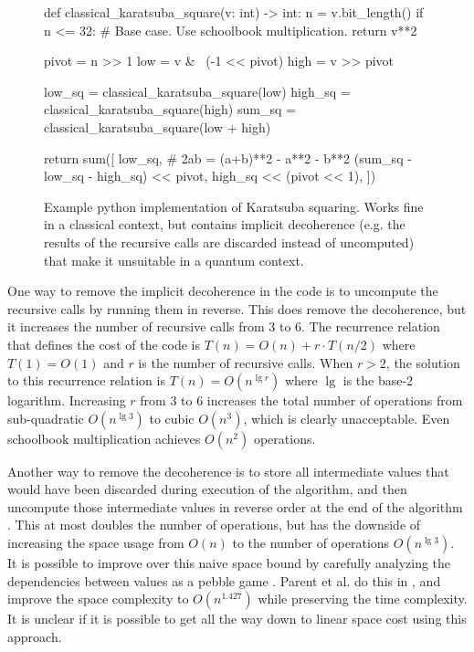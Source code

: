\documentclass[onecolumn,unpublished]{quantumarticle}
\begin{document}
\begin{figure}
\begin{python}
def classical_karatsuba_square(v: int) -> int:
    n = v.bit_length()
    if n <= 32:
        # Base case. Use schoolbook multiplication.
        return v**2

    pivot = n >> 1
    low = v & ~(-1 << pivot)
    high = v >> pivot

    low_sq = classical_karatsuba_square(low)
    high_sq = classical_karatsuba_square(high)
    sum_sq = classical_karatsuba_square(low + high)

    return sum([
        low_sq,
        # 2ab = (a+b)**2 - a**2 - b**2
        (sum_sq - low_sq - high_sq) << pivot,
        high_sq << (pivot << 1),
    ])
\end{python}
\caption{
\label{fig:classical_code}
   Example python implementation of Karatsuba squaring.
   Works fine in a classical context, but contains implicit decoherence (e.g. the results of the recursive calls are discarded instead of uncomputed) that make it unsuitable in a quantum context.
}
\end{figure}

One way to remove the implicit decoherence in the code is to uncompute the recursive calls by running them in reverse.
This does remove the decoherence, but it increases the number of recursive calls from 3 to 6.
The recurrence relation that defines the cost of the code is $T(n) = O(n) + r \cdot T(n/2)$ where $T(1) = O(1)$ and $r$ is the number of recursive calls.
When $r>2$, the solution to this recurrence relation is $T(n) = O(n^{\lg r})$ where $\lg$ is the base-2 logarithm.
Increasing $r$ from 3 to 6 increases the total number of operations from sub-quadratic $O(n^{\lg 3})$ to cubic $O(n^3)$, which is clearly unacceptable.
Even schoolbook multiplication achieves $O(n^2)$ operations.

Another way to remove the decoherence is to store all intermediate values that would have been discarded during execution of the algorithm, and then uncompute those intermediate values in reverse order at the end of the algorithm \cite{bennett1973logical}.
This at most doubles the number of operations, but has the downside of increasing the space usage from $O(n)$ to the number of operations $O(n^{\lg 3})$.
It is possible to improve over this naive space bound by carefully analyzing the dependencies between values as a pebble game \cite{bennett1989pebble}.
Parent et al. do this in \cite{parent2017karatsuba}, and improve the space complexity to $O(n^{1.427})$ while preserving the time complexity.
It is unclear if it is possible to get all the way down to linear space cost using this approach.
\end{document}
